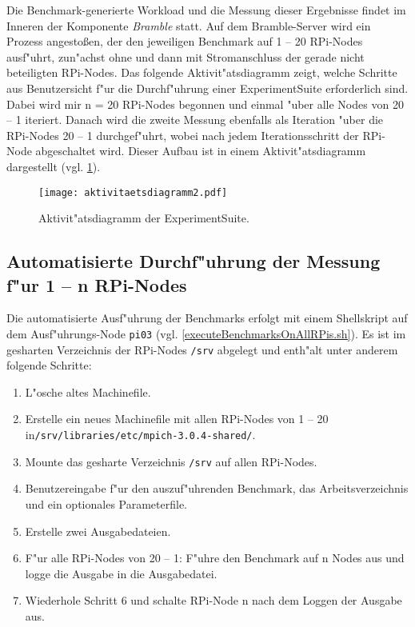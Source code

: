 Die Benchmark-generierte Workload und die Messung dieser Ergebnisse findet im Inneren der Komponente \textit{Bramble} statt. Auf dem Bramble-Server wird ein Prozess angesto\ss en, der den jeweiligen Benchmark auf 1 -- 20 RPi-Nodes ausf"uhrt, zun"achst ohne und dann mit Stromanschluss der gerade nicht beteiligten RPi-Nodes. Das folgende Aktivit"atsdiagramm zeigt, welche Schritte aus Benutzersicht f"ur die Durchf"uhrung einer ExperimentSuite erforderlich sind. Dabei wird mir n = 20 RPi-Nodes begonnen und einmal "uber alle Nodes von 20 -- 1 iteriert. Danach wird die zweite Messung ebenfalls als Iteration "uber die RPi-Nodes 20 -- 1 durchgef"uhrt, wobei nach jedem Iterationsschritt der RPi-Node abgeschaltet wird. Dieser Aufbau ist in einem Aktivit"atsdiagramm dargestellt (vgl. \ref{fig:Aktivitaetsdiagramm}).  
\begin{figure}[htb]
  \centering
  \texttt{[image: aktivitaetsdiagramm2.pdf]}\\ 
  \caption{Aktivit"atsdiagramm der ExperimentSuite.}
  \label{fig:Aktivitaetsdiagramm}
\end{figure}

\subsection{Automatisierte Durchf"uhrung der Messung f"ur 1 -- n RPi-Nodes}
Die automatisierte Ausf"uhrung der Benchmarks erfolgt mit einem Shellskript auf dem Ausf"uhrungs-Node \texttt{pi03} (vgl. \ref{executeBenchmarksOnAllRPis.sh}). Es ist im gesharten Verzeichnis der RPi-Nodes \texttt{/srv} abgelegt und enth"alt unter anderem folgende Schritte: 
\begin{enumerate}
	\item L"osche altes Machinefile.
	\item Erstelle ein neues Machinefile mit allen RPi-Nodes von 1 -- 20 in\newline\texttt{/srv/libraries/etc/mpich-3.0.4-shared/}.
	\item Mounte das gesharte Verzeichnis \texttt{/srv} auf allen RPi-Nodes.
	\item Benutzereingabe f"ur den auszuf"uhrenden Benchmark, das Arbeitsverzeichnis und ein optionales Parameterfile. 
	\item Erstelle zwei Ausgabedateien. 
	\item F"ur alle RPi-Nodes von 20 -- 1: F"uhre den Benchmark auf n Nodes aus und logge die Ausgabe in die Ausgabedatei.
	\item Wiederhole Schritt 6 und schalte RPi-Node n nach dem Loggen der Ausgabe aus.  
\end{enumerate}

